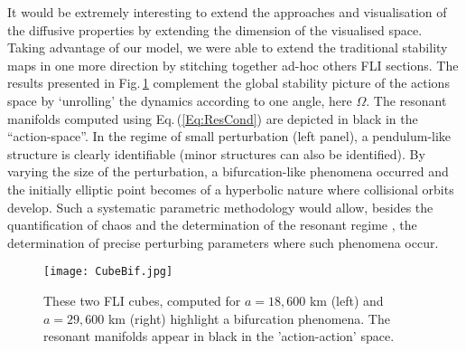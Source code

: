 \documentclass{amsart}
\theoremstyle{definition}
\theoremstyle{remark}
\numberwithin{equation}{section}
\begin{document}
{\color{black}
It would be extremely interesting to extend the approaches and visualisation of the diffusive properties by extending the dimension of the visualised space. Taking advantage of our model, we were able to extend the traditional stability maps in one more direction by stitching together ad-hoc others FLI sections. The results presented in Fig.\,\ref{fig:Cube} complement the global stability picture of the actions space by `unrolling' the dynamics according to one angle, here $\Omega$. The resonant manifolds computed using Eq.\,(\ref{Eq:ResCond}) are depicted in black in the ``action-space''. In the regime of small perturbation (left panel), a pendulum-like structure is clearly identifiable (minor structures can also be identified). By varying the size of the perturbation, a bifurcation-like phenomena occurred and the initially elliptic point becomes of a hyperbolic nature where collisional orbits develop. Such a systematic parametric methodology would allow,  besides the quantification of chaos and the determination of the resonant regime \citep[cf.][]{cFr00}, the determination of precise perturbing parameters where such phenomena occur.}

\begin{figure}
\texttt{[image: CubeBif.jpg]}
\caption{\label{fig:Cube} 
{\color{black}These two FLI cubes,  computed for $a=18,600$ km (left) and $a=29,600$ km (right)
highlight a bifurcation phenomena.
The resonant manifolds appear in black in the 'action-action' space.} 
}
\end{figure}

\end{document}
